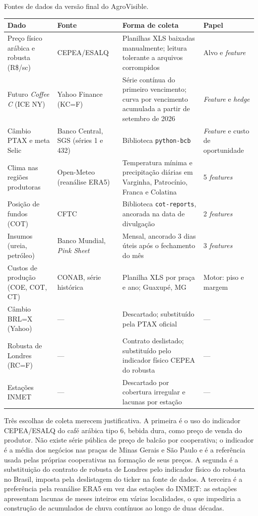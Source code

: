 \begin{quadro}[htb]
	\centering
	\caption{Fontes de dados da versão final do AgroVisible.}\label{qua:fontes}
	\begin{tabular}{L{3.6cm} L{3.4cm} L{5.2cm} L{2.2cm}}
		\hline
		\textbf{Dado} & \textbf{Fonte} & \textbf{Forma de coleta} & \textbf{Papel} \\ \hline
		Preço físico arábica e robusta (R\$/sc) & CEPEA/ESALQ & Planilhas XLS baixadas manualmente; leitura tolerante a arquivos corrompidos & Alvo e \textit{feature} \\
		Futuro \textit{Coffee C} (ICE NY) & Yahoo Finance (KC=F) & Série contínua do primeiro vencimento; curva por vencimento acumulada a partir de setembro de 2026 & \textit{Feature} e \textit{hedge} \\
		Câmbio PTAX e meta Selic & Banco Central, SGS (séries 1 e 432) & Biblioteca \texttt{python-bcb} & \textit{Feature} e custo de oportunidade \\
		Clima nas regiões produtoras & Open-Meteo (reanálise ERA5) & Temperatura mínima e precipitação diárias em Varginha, Patrocínio, Franca e Colatina & 5 \textit{features} \\
		Posição de fundos (COT) & CFTC & Biblioteca \texttt{cot-reports}, ancorada na data de divulgação & 2 \textit{features} \\
		Insumos (ureia, petróleo) & Banco Mundial, \textit{Pink Sheet} & Mensal, ancorado 3 dias úteis após o fechamento do mês & 3 \textit{features} \\
		Custos de produção (COE, COT, CT) & CONAB, série histórica & Planilha XLS por praça e ano; Guaxupé, MG & Motor: piso e margem \\ \hline
		Câmbio BRL=X (Yahoo) & --- & Descartado; substituído pela PTAX oficial & --- \\
		Robusta de Londres (RC=F) & --- & Contrato deslistado; substituído pelo indicador físico CEPEA do robusta & --- \\
		Estações INMET & --- & Descartado por cobertura irregular e lacunas por estação & --- \\ \hline
	\end{tabular}
\end{quadro}

Três escolhas de coleta merecem justificativa. A primeira é o uso do indicador CEPEA/ESALQ do café arábica tipo 6, bebida dura, como preço de venda do produtor. Não existe série pública de preço de balcão por cooperativa; o indicador é a média dos negócios nas praças de Minas Gerais e São Paulo e é a referência usada pelas próprias cooperativas na formação de seus preços. A segunda é a substituição do contrato de robusta de Londres pelo indicador físico do robusta no Brasil, imposta pela deslistagem do ticker na fonte de dados. A terceira é a preferência pela reanálise ERA5 em vez das estações do INMET: as estações apresentam lacunas de meses inteiros em várias localidades, o que impediria a construção de acumulados de chuva contínuos ao longo de duas décadas.

